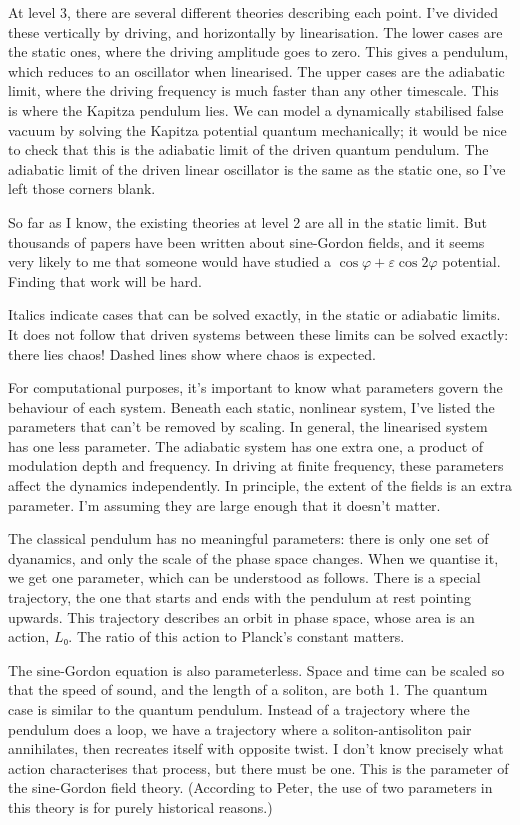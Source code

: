 At level 3, there are several different theories describing each point.  I've divided these vertically by driving, and horizontally by linearisation.  The lower cases are the static ones, where the driving amplitude goes to zero.  This gives a pendulum, which reduces to an oscillator when linearised.  The upper cases are the adiabatic limit, where the driving frequency is much faster than any other timescale.  This is where the Kapitza pendulum lies.  We can model a dynamically stabilised false vacuum by solving the Kapitza potential quantum mechanically; it would be nice to check that this is the adiabatic limit of the driven quantum pendulum.  The adiabatic limit of the driven linear oscillator is the same as the static one, so I've left those corners blank.

So far as I know, the existing theories at level 2 are all in the static limit.  But thousands of papers have been written about sine-Gordon fields, and it seems very likely to me that someone would have studied a $\cos φ + ε\cos 2φ$ potential.  Finding that work will be hard.

Italics indicate cases that can be solved exactly, in the static or adiabatic limits.  It does not follow that driven systems between these limits can be solved exactly: there lies chaos!  Dashed lines show where chaos is expected.

For computational purposes, it's important to know what parameters govern the behaviour of each system.  Beneath each static, nonlinear system, I've listed the parameters that can't be removed by scaling.  In general, the linearised system has one less parameter.  The adiabatic system has one extra one, a product of modulation depth and frequency.  In driving at finite frequency, these parameters affect the dynamics independently.  In principle, the extent of the fields is an extra parameter.  I'm assuming they are large enough that it doesn't matter.

The classical pendulum has no meaningful parameters: there is only one set of dyanamics, and only the scale of the phase space changes.  When we quantise it, we get one parameter, which can be understood as follows.  There is a special trajectory, the one that starts and ends with the pendulum at rest pointing upwards.  This trajectory describes an orbit in phase space, whose area is an action, $L₀$.  The ratio of this action to Planck's constant matters.

The sine-Gordon equation is also parameterless.  Space and time can be scaled so that the speed of sound, and the length of a soliton, are both 1.  The quantum case is similar to the quantum pendulum.  Instead of a trajectory where the pendulum does a loop, we have a trajectory where a soliton-antisoliton pair annihilates, then recreates itself with opposite twist.  I don't know precisely what action characterises that process, but there must be one.  This is the parameter of the sine-Gordon field theory.  (According to Peter, the use of two parameters in this theory is for purely historical reasons.)

